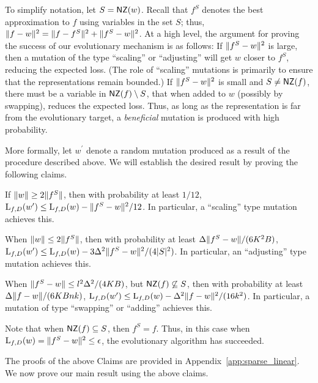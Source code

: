 To simplify notation, let $S = \mathsf{NZ}(w)$. Recall that $f^S$ denotes the best
approximation to $f$ using variables in the set $S$; thus, $\Vert f - w \Vert^2 =
\Vert f - f^S \Vert^2 + \Vert f^S - w \Vert^2$. At a high level, the argument for
proving the success of our evolutionary mechanism is as follows: If
$\Vert f^S - w \Vert^2$ is large, then a mutation of the type ``scaling'' or
``adjusting'' will get $w$ closer to $f^S$, reducing the expected loss. (The
role of ``scaling'' mutations is primarily to ensure that the representations
remain bounded.) If $\Vert f^S - w \Vert^2$ is small and $S \neq \mathsf{NZ}(f)$, there
must be a variable in $\mathsf{NZ}(f) \setminus S$, that when added to $w$ (possibly by
swapping), reduces the expected loss. Thus, as long as the representation is far
from the evolutionary target, a \emph{beneficial} mutation is produced with high
probability.

More formally, let $w^\prime$ denote a random mutation produced as a result of
the procedure described above.  We will establish the desired result by proving
the following claims.
\begin{claim} \label{claim:apple} If $\Vert w \Vert \geq 2 \Vert f^S \Vert$, then
with probability at least $1/12$, $\mathrm{L}_{f, D}(w^\prime) \leq \mathrm{L}_{f, D}(w) -
\Vert f^S - w \Vert^2/12$. In particular, a ``scaling'' type mutation achieves
this. \end{claim}
\begin{claim} \label{claim:banana} When $\Vert w \Vert \leq 2 \Vert f^S \Vert$,
then with probability at least $\Delta \Vert f^S - w \Vert/(6K^2 B)$, $\mathrm{L}_{f,
D}(w^\prime) \leq \mathrm{L}_{f, D}(w) - 3 \Delta^2\Vert f^S - w \Vert^2/(4|S|^2)$. In
particular, an ``adjusting'' type mutation achieves this. \end{claim}
\begin{claim} \label{claim:cantaloupe} When $\Vert f^S - w \Vert \leq
l^2\Delta^2/(4KB)$, but $\mathsf{NZ}(f) \not\subseteq S$, then with probability at least
$\Delta \Vert f - w \Vert/(6KBnk)$, $\mathrm{L}_{f, D}(w^\prime) \leq \mathrm{L}_{f, D}(w)
- \Delta^2 \Vert f-w \Vert^2/(16k^2)$. In particular, a mutation of type
``swapping'' or ``adding'' achieves this.
\end{claim}

\noindent Note that when $\mathsf{NZ}(f) \subseteq S$, then $f^S = f$. Thus, in this case
when $\mathrm{L}_{f, D}(w) = \Vert f^S - w \Vert^2 \leq \epsilon$, the evolutionary
algorithm has succeeded. \medskip 

The proofs of the above Claims are provided in
Appendix~\ref{app:sparse_linear}. We now prove our main result using the
above claims.

